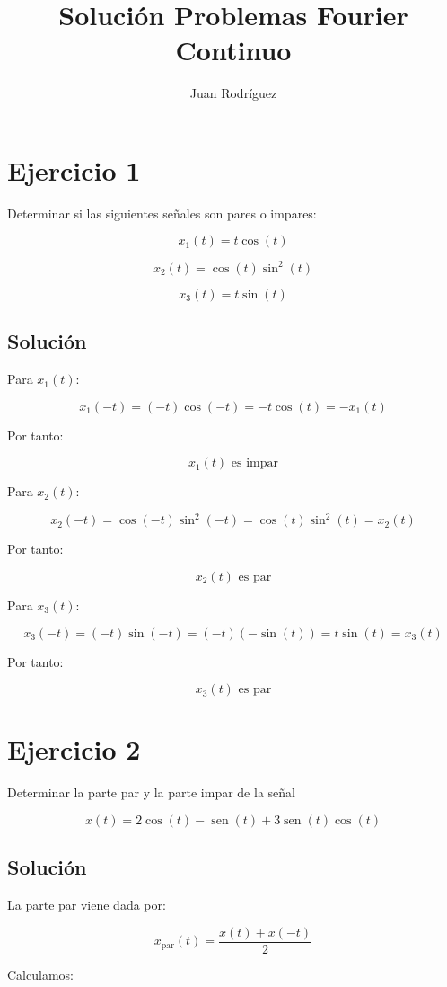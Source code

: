 \documentclass[fleqn]{article}
\title{Solución Problemas Fourier Continuo}
\author{Juan Rodríguez}
\DeclareMathOperator{\sen}{sen}
\begin{document}
\maketitle
\section{Ejercicio 1}
	Determinar si las siguientes señales son pares o impares:

	\[
	x_1(t)=t\cos(t)
	\]

	\[
	x_2(t)=\cos(t)\sin^2(t)
	\]

	\[
	x_3(t)=t\sin(t)
	\]

	\subsection{Solución}

	Para $x_1(t)$:

	\[
	x_1(-t)
	=
	(-t)\cos(-t)
    =
	-t\cos(t)
	=
	-x_1(t)
	\]

	Por tanto:

	\[
	\boxed{
	x_1(t)\text{ es impar}
	}
	\]

	Para $x_2(t)$:

	\[
	x_2(-t)
	=
	\cos(-t)\sin^2(-t)
	=
	\cos(t)\sin^2(t)
	=
	x_2(t)
	\]

	Por tanto:

	\[
	\boxed{
	x_2(t)\text{ es par}
	}
	\]

	Para $x_3(t)$:

	\[
	x_3(-t)
	=
	(-t)\sin(-t)
	=
	(-t)(-\sin(t))
	=
	t\sin(t)
	=
	x_3(t)
	\]

	Por tanto:

	\[
	\boxed{
	x_3(t)\text{ es par}
	}
	\]

\section{Ejercicio 2}
	Determinar la parte par y la parte impar de la señal

	\[
	x(t)=2\cos(t)-\sen(t)+3\sen(t)\cos(t)
	\]

	\subsection{Solución}

	La parte par viene dada por:

	\[
	x_{\text{par}}(t)
	=
	\frac{x(t)+x(-t)}{2}
	\]

	Calculamos:
\end{document}
